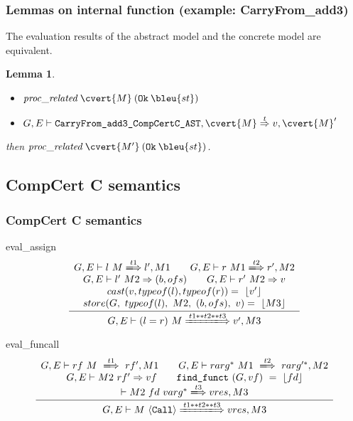 \documentclass[usenames,dvipsnames]{beamer} %
\newtheorem{lem}{Lemma} %
\begin{document}
\begin{frame}
\frametitle{Lemmas on internal function (example: CarryFrom\_add3)}
The evaluation results of the abstract model and the concrete model are equivalent.
\begin{lem}
\begin{itemize}
\item $\mathit{proc\_related} \: \cvert{M} \: (\texttt{Ok}\: \bleu{st})$
\item $G,E\vdash \texttt{CarryFrom\_add3\_CompCertC\_AST},\cvert{M}\overset{t}{\Rightarrow}v,\cvert{M}'$
\end{itemize}
then $\mathit{proc\_related} \: \cvert{M'} \: (\texttt{Ok}\: \bleu{st})$.
\end{lem}
\end{frame}

\subsection{CompCert C semantics}
\begin{frame}
\frametitle{CompCert C semantics}
\begin{block}{eval\_assign}
\begin{equation}
\frac
{\begin{array}{c}
G,E\vdash l~M\xLongrightarrow{t1}l',M1\qquad
G,E\vdash r~M1\xLongrightarrow{t2}r',M2\\
G,E\vdash l'~M2\Rightarrow (b, ofs)\qquad
G,E\vdash r'~M2\Rightarrow v\\
cast(v,typeof(l),typeof(r))=~\lfloor v'\rfloor\\
store (G,~typeof(l),~M2,~(b,ofs),~v)=~\lfloor M3\rfloor\\
\end{array}
}
{G,E\vdash (l=r)~M\xLongrightarrow{t1**t2**t3}v',M3}
\end{equation}
\end{block}
\begin{block}{eval\_funcall}
\begin{equation}
\frac
{\begin{array}{c}
G,E\vdash rf~M~\xLongrightarrow{t1}~rf',M1\qquad
G,E\vdash rarg^*~M1~\xLongrightarrow{t2}~rarg'^*,M2\\
G,E\vdash M2~rf' \Rightarrow vf\qquad
\texttt{find\_funct}~(G,vf)~=~\lfloor fd\rfloor\\
\vdash M2~fd~varg^* \xLongrightarrow{t3}vres,M3
\end{array}
}
{G,E\vdash M~\langle\textrm{\texttt{Call}}\rangle\xLongrightarrow{t1**t2**t3}vres,M3}
\end{equation}
\end{block}
\end{frame}
\end{document}
